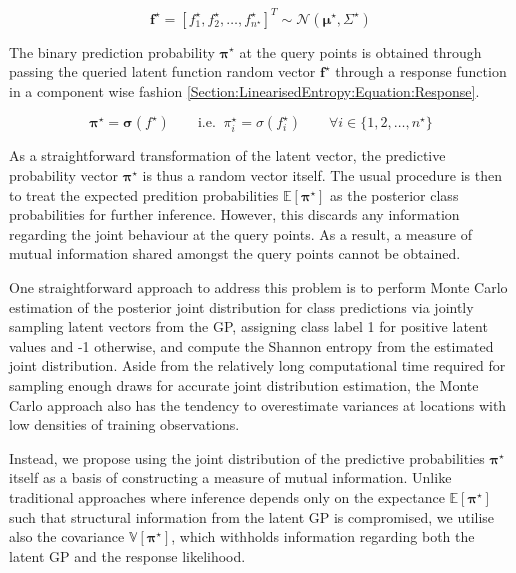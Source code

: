 \documentclass{article}
\renewcommand{\vec}[1]{\boldsymbol{#1}}
\begin{document}
		\begin{equation}
			\vec{f}^{\star} = [f^{\star}_{1}, f^{\star}_{2}, \dots, f^{\star}_{n^{\star}}]^{T} \sim \mathcal{N}(\vec{\mu}^{\star}, \Sigma^{\star})
		\label{Section:LinearisedEntropy:Equation:PredictiveGaussianDistribution}
		\end{equation}
			
		The binary prediction probability $\vec{\pi^{\star}}$ at the query points is obtained through passing the queried latent function random vector $\vec{f}^{\star}$ through a response function in a component wise fashion \eqref{Section:LinearisedEntropy:Equation:Response}.
		
		\begin{equation}
			\vec{\pi}^{\star} = \vec{\sigma}(f^{\star})\mathrm{ \qquad i.e. \;\;}\pi^{\star}_{i} = \sigma(f^{\star}_{i}) \qquad \forall i \in \{1, 2, \dots, n^{\star}\}
		\label{Section:LinearisedEntropy:Equation:Response}
		\end{equation}
		
		As a straightforward transformation of the latent vector, the predictive probability vector $\vec{\pi^{\star}}$ is thus a random vector itself. The usual procedure is then to treat the expected predition probabilities $\mathbb{E}[\vec{\pi^{\star}}]$ as the posterior class probabilities for further inference. However, this discards any information regarding the joint behaviour at the query points. As a result, a measure of mutual information shared amongst the query points cannot be obtained.
		
		One straightforward approach to address this problem is to perform Monte Carlo estimation of the posterior joint distribution for class predictions via jointly sampling latent vectors from the GP, assigning class label 1 for positive latent values and -1 otherwise, and compute the Shannon entropy \cite{ShannonEntropy} from the estimated joint distribution. Aside from the relatively long computational time required for sampling enough draws for accurate joint distribution estimation, the Monte Carlo approach also has the tendency to overestimate variances at locations with low densities of training observations.
				
		Instead, we propose using the joint distribution of the predictive probabilities $\vec{\pi^{\star}}$ itself as a basis of constructing a measure of mutual information. Unlike traditional approaches where inference depends only on the expectance $\mathbb{E}[\vec{\pi^{\star}}]$ such that structural information from the latent GP is compromised, we utilise also the covariance $\mathbb{V}[\vec{\pi^{\star}}]$, which withholds information regarding both the latent GP and the response likelihood.
	
\end{document}
